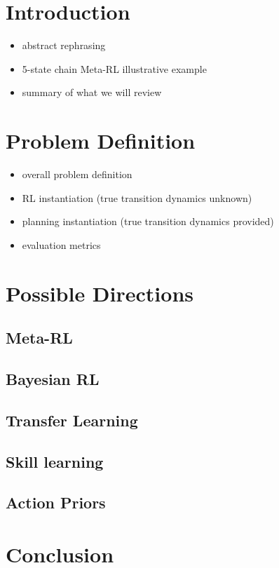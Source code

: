\documentclass[11pt]{article} %
\begin{document}
\begin{abstract}
\end{abstract}




\startmain %

\section{Introduction}

\begin{itemize}
\item abstract rephrasing
\item 5-state chain Meta-RL illustrative example
\item summary of what we will review
\end{itemize}

\section{Problem Definition}
\begin{itemize}
\item overall problem definition
\item RL instantiation (true transition dynamics unknown)
\item planning instantiation (true transition dynamics provided)
\item evaluation metrics 
\end{itemize}

\section{Possible Directions}
\subsection{Meta-RL}
\subsection{Bayesian RL}
\subsection{Transfer Learning}
\subsection{Skill learning}
\subsection{Action Priors}

\section{Conclusion}
\end{document}
